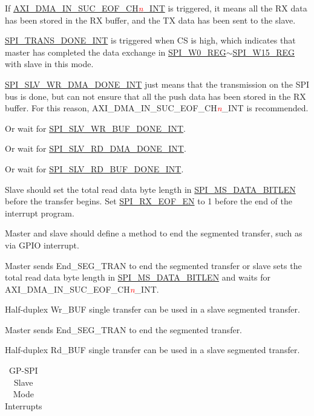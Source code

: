\documentclass[main\_\_EN.tex]{subfiles}
\begin{document}
\begin{ThreePartTable}

\begin{TableNotes}
    \item[1] If \hyperref[int:GDMAINSUCEOFINT]{AXI\_DMA\_IN\_SUC\_EOF\_CH\textcolor{red}{\it{n}}\_INT} is triggered, it means all the RX data has been stored in the RX buffer, and the TX data has been sent to the slave.
    \item[2] \hyperref[int:SPITRANSDONEINT]{SPI\_TRANS\_DONE\_INT} is triggered when CS is high, which indicates that master has completed the data exchange in \hyperref[regdesc:SPIW0REG]{SPI\_W0\_REG}$\sim$\hyperref[regdesc:SPIW15REG]{SPI\_W15\_REG} with slave in this mode.
    \item[3] \hyperref[int:SPISLVWRDMADONEINT]{SPI\_SLV\_WR\_DMA\_DONE\_INT} just means that the transmission on the SPI bus is done, but can not ensure that all the push data has been stored in the RX buffer. For this reason, AXI\_DMA\_IN\_SUC\_EOF\_CH\textcolor{red}{\it{n}}\_INT is recommended.
    \item[4] Or wait for \hyperref[int:SPISLVWRBUFDONEINT]{SPI\_SLV\_WR\_BUF\_DONE\_INT}.
    \item[5] Or wait for \hyperref[int:SPISLVRDDMADONEINT]{SPI\_SLV\_RD\_DMA\_DONE\_INT}.
    \item[6] Or wait for \hyperref[int:SPISLVRDBUFDONEINT]{SPI\_SLV\_RD\_BUF\_DONE\_INT}.
    \item[7] Slave should set the total read data byte length in \hyperref[fielddesc:SPIMSDATABITLEN]{SPI\_MS\_DATA\_BITLEN} before the transfer begins. Set \hyperref[fielddesc:SPIRXEOFEN]{SPI\_RX\_EOF\_EN} to 1 before the end of the interrupt program.
    \item[8] Master and slave should define a method to end the segmented transfer, such as via GPIO interrupt.
    \item[9] Master sends End\_SEG\_TRAN to end the segmented transfer or slave sets the total read data byte length in \hyperref[fielddesc:SPIMSDATABITLEN]{SPI\_MS\_DATA\_BITLEN} and waits for AXI\_DMA\_IN\_SUC\_EOF\_CH\textcolor{red}{\it{n}}\_INT.
    \item[10] Half-duplex Wr\_BUF single transfer can be used in a slave segmented transfer.
    \item[11] Master sends End\_SEG\_TRAN to end the segmented transfer.
    \item[12] Half-duplex Rd\_BUF single transfer can be used in a slave segmented transfer.
\end{TableNotes}
\begin{longtable}[c]{|l|l|l|l|}
\caption{GP-SPI Slave Mode Interrupts}
\label{Table:Slv_Int_Table}
\\\hline


\end{longtable}
\end{ThreePartTable}
\end{document}

